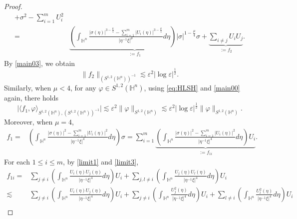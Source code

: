 \documentclass[10pt,a4paper]{amsart}
\begin{document}
\begin{proof}
\begin{align}
+
\sigma^2-\sum\limits_{i=1}^mU_i^2 \nonumber\\
=  &\underbrace{\left(\int_{\mathbb{H}^{n}}\frac{|\sigma(\eta)|^{3-\frac{\mu}{4}}
-\sum\limits_{i=1}^m|U_i(\eta)|^{3-\frac{\mu}{4}}}{|\eta^{-1}\xi|^{\mu}}{d}\eta\right)|\sigma|^{1-\frac{\mu}{4}}\sigma
}_{:=f_1}+\underbrace{\sum\limits_{i\neq j} U_i U_j}_{:=f_2}.
\end{align}
By \eqref{main03}, we obtain
\begin{equation}\label{main22}
  \|f_2\|_{(S^{1,2}(\mathbb{H}^{n}))^{-1}}\lesssim \varepsilon^2|\log \varepsilon|^{\frac{1}{2}}.
\end{equation}
Similarly, when $\mu<4$, for any $\varphi\in S^{1,2}(\mathbb{H}^{n})$, using \eqref{eq:HLSH} and \eqref{main00} again, there holds
\begin{equation}\label{main23}
  \big|\langle f_1,\varphi\rangle_{S^{1,2}(\mathbb{H}^{n}),(S^{1,2}(\mathbb{H}^{n}))^{-1}}\big|\lesssim \varepsilon^{2}\|\varphi\|_{S^{1,2}(\mathbb{H}^{n})}\lesssim \varepsilon^{2}|\log \varepsilon|^{\frac{1}{2}}\|\varphi\|_{S^{1,2}(\mathbb{H}^{n})}.
\end{equation}
Moreover, when $\mu=4$,
\begin{align}\label{main24}
  f_1=&\left(\int_{\mathbb{H}^{n}}\frac{|\sigma(\eta)|^{2}
-\sum\limits_{i=1}^m|U_i(\eta)|^{2}}{|\eta^{-1}\xi|^{4}}{d}\eta\right)\sigma
=\sum\limits_{i=1}^m\underbrace{\left(\int_{\mathbb{H}^{n}}\frac{|\sigma(\eta)|^{2}
-\sum\limits_{i=1}^m|U_i(\eta)|^{2}}{|\eta^{-1}\xi|^{4}}{d}\eta\right)U_i}_{:=f_{1i}}.
\end{align}
For each $1\leq i\leq m$, by \eqref{limit1} and \eqref{limit3},
\begin{align}\label{main25}
  f_{1i}=&\sum\limits_{j\neq i}\left(\int_{\mathbb{H}^{n}}\frac{U_i (\eta) U_j(\eta)}{|\eta^{-1}\xi|^{4}}{d}\eta\right)U_i+\sum\limits_{j,l\neq i}\left(\int_{\mathbb{H}^{n}}\frac{U_j(\eta) U_l(\eta)}{|\eta^{-1}\xi|^{4}}{d}\eta\right)U_i \nonumber\\
  \lesssim &\sum\limits_{j\neq i}\left(\int_{\mathbb{H}^{n}}\frac{U_i (\eta) U_j(\eta)}{|\eta^{-1}\xi|^{4}}{d}\eta\right)U_i+\sum\limits_{j\neq i}\left(\int_{\mathbb{H}^{n}}\frac{U_j^2(\eta)}{|\eta^{-1}\xi|^{4}}{d}\eta\right)U_i+\sum\limits_{l\neq i}\left(\int_{\mathbb{H}^{n}}\frac{U_l^2(\eta)}{|\eta^{-1}\xi|^{4}}{d}\eta\right)U_i \nonumber\\

\end{align}
\end{proof}
\end{document}
